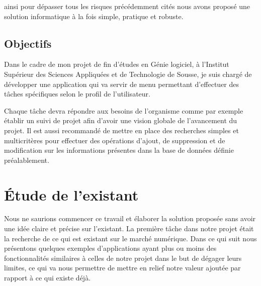 \par ainsi pour dépasser tous les risques précédemment cités nous avons proposé une solution informatique à la fois simple, pratique et robuste.


\subsection{	Objectifs}
  \hspace{4mm}  Dans le cadre de mon projet de fin d’études en Génie logiciel, à l’Institut Supérieur des Sciences Appliquées et de Technologie de Sousse, je suis chargé de développer une application qui va servir de menu permettant d’effectuer des tâches spécifiques selon le profil de l’utilisateur.  
\par Chaque tâche devra répondre aux besoins de l’organisme comme par exemple établir un suivi de projet afin d’avoir une vision globale de l’avancement du projet. Il est aussi recommandé de mettre en place des recherches simples et multicritères pour effectuer des opérations d’ajout, de suppression et de modification sur les informations présentes dans la base de données définie préalablement.
\section{	Étude de l'existant}
\hspace{4mm} Nous ne saurions commencer ce travail et élaborer la solution proposée sans avoir une idée claire et précise sur l’existant. La première tâche dans notre projet était la recherche de ce qui est existant sur le marché numérique. Dans ce qui suit nous présentons quelques exemples d’applications ayant plus ou moins des fonctionnalités similaires à celles de notre projet dans le but de dégager leurs limites, ce qui va nous permettre de mettre en relief notre valeur ajoutée par rapport à ce qui existe déjà.

